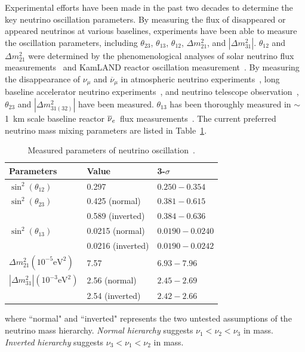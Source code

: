     Experimental efforts have been made in the past two decades to determine the key neutrino oscillation parameters.
    By measuring the flux of disappeared or appeared neutrinos at various baselines, experiments have been able to measure the oscillation parameters, including $\theta_{23}$, $\theta_{13}$, $\theta_{12}$, $\Delta m^2_{21}$, and $|\Delta m^2_{31}|$. 
    $\theta_{12}$ and $\Delta m^2_{21}$ were determined by the  phenomenological analyses of solar neutrino flux measurements~\cite{bib:SNOPRC} and KamLAND reactor \nuebar oscillation measurement~\cite{bib:KamLAND03}.
    By measuring the disappearance of $\nu_\mu$ and $\overline{\nu}_\mu$ in atmospheric neutrino experiments~\cite{bib:MACRO,bib:Soudan2}, long baseline accelerator neutrino experiments~\cite{bib:k2k,bib:MINOS,bib:t2k,bib:nova}, and neutrino telescope observation~\cite{bib:ANTARES, bib:ICEosc}, $\theta_{23}$ and $|\Delta m^2_{31(32)}|$ have been measured.
    $\theta_{13}$ has been thoroughly measured in $\sim$1~km scale baseline reactor $\overline{\nu }_{e}\hspace{1pt}$ flux measurements~\cite{bib:DYBosc,bib:RENO,bib:DBChooz}.
    The current preferred neutrino mass mixing parameters are listed in Table~\ref{tab:1.1}.
    \begin{table}[h]
    \centering
    \caption[Key parameters of neutrino oscillation]{Measured parameters of neutrino oscillation~\cite{bib:PDG}.}
    \begin{tabular}{lll}
    \hline
    \hline
    Parameters                  & Value             & 3-$\sigma$    \\ \hline
    $\sin^2(\theta _{12})$      & 0.297             & $0.250 - 0.354$
    \\ \hline
    $\sin^2(\theta _{23})$      & 0.425 (normal)    & $0.381 - 0.615$ \\
                                & 0.589 (inverted)  & $0.384 - 0.636$ \\ \hline
    $\sin^2(\theta_{13})$       & 0.0215 (normal)   & $0.0190 - 0.0240$ \\   
                                & 0.0216 (inverted) & $0.0190 - 0.0242$ \\ \hline
    $\Delta m^ 2_{21} (10^{-5}\textrm{eV}^2) $      & 7.57              & $6.93 - 7.96$ \\ \hline
    $|\Delta m^ 2_{31}| (10^{-3}\textrm{eV}^2) $    & 2.56 (normal)     & $2.45 - 2.69$\\
                                & 2.54 (inverted)   & $2.42 - 2.66$\\
    \hline
    \end{tabular}
    \label{tab:1.1}
    \end{table}
    where ``normal" and ``inverted" represents the two untested assumptions of the neutrino mass hierarchy. 
    \textit{Normal hierarchy} suggests $\nu_1 < \nu_2 < \nu_3$ in mass. 
    \textit{Inverted hierarchy} suggests $\nu_3 < \nu_1 < \nu_2$ in mass. 
    
